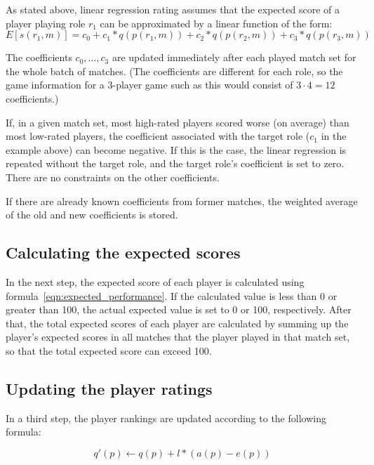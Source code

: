 \documentclass[a4paper,10pt]{article}
\begin{document}
As stated above, linear regression rating assumes that the expected score of a
player playing role $r_1$ can be approximated by a linear function of the form:
\begin{equation}
	E[s(r_1, m)] = c_0 + c_1*q(p(r_1, m)) + c_2*q(p(r_2, m)) + c_3*q(p(r_3, m)) 
	\label{eqn:expected_performance}
\end{equation} 

The coefficients $c_0, \dotsc, c_3$ are updated immediately after each played
match set for the whole batch of matches. (The coefficients are different for
each role, so the game information for a 3-player game such as this would
consist of $3 \cdot 4 = 12$ coefficients.)

If, in a given match set, most high-rated players scored worse (on average) than
most low-rated players, the coefficient associated with the target role ($c_1$
in the example above) can become negative. If this is the case, the linear
regression is repeated without the target role, and the target role's
coefficient is set to zero. There are no constraints on the other coefficients.

If there are already known coefficients from former matches, the weighted
average of the old and new coefficients is stored.

\subsection{Calculating the expected scores}
\label{sec:calculating_expected_scores}
In the next step, the expected score of each player is calculated using
formula~\ref{eqn:expected_performance}. If the calculated value is less than 0
or greater than 100, the actual expected value is set to 0 or 100, respectively.
After that, the total expected scores of each player are calculated by summing
up the player's expected scores in all matches that the player played in that
match set, so that the total expected score can exceed 100.


\subsection{Updating the player ratings}
\label{sec:updating_player_ratings}

In a third step, the player rankings are updated according to the following formula:

\begin{equation}
 q'(p) \leftarrow q(p) + l * (a(p) - e(p))
\end{equation} 
\end{document}

